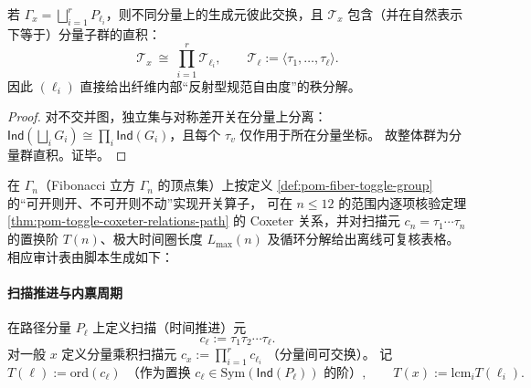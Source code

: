 \begin{corollary}\label{cor:pom-toggle-product-components}
若 \(\Gamma_x=\bigsqcup_{i=1}^r P_{\ell_i}\)，则不同分量上的生成元彼此交换，且 \(\mathcal T_x\) 包含（并在自然表示下等于）分量子群的直积：
\[
\mathcal T_x\ \cong\ \prod_{i=1}^r \mathcal T_{\ell_i},
\qquad
\mathcal T_{\ell}:=\langle \tau_1,\dots,\tau_{\ell}\rangle.
\]
因此 \((\ell_i)\) 直接给出纤维内部“反射型规范自由度”的秩分解。
\end{corollary}
\begin{proof}
对不交并图，独立集与对称差开关在分量上分离：\(\mathsf{Ind}(\bigsqcup_i G_i)\cong\prod_i\mathsf{Ind}(G_i)\)，且每个 \(\tau_v\) 仅作用于所在分量坐标。
故整体群为分量群直积。证毕。
\end{proof}



\begin{remark}[有限窗审计]\label{rem:pom-toggle-coxeter-audit}
在 \(\Gamma_n\)（Fibonacci 立方 \(\Gamma_n\) 的顶点集）上按定义 \ref{def:pom-fiber-toggle-group} 的“可开则开、不可开则不动”实现开关算子，
可在 \(n\le 12\) 的范围内逐项核验定理 \ref{thm:pom-toggle-coxeter-relations-path} 的 Coxeter 关系，并对扫描元 \(c_n=\tau_1\cdots\tau_n\) 的置换阶 \(T(n)\)、极大时间圈长度 \(L_{\max}(n)\) 及循环分解给出离线可复核表格。
相应审计表由脚本生成如下：

\end{remark}

\paragraph{扫描推进与内禀周期}

\begin{definition}[扫描元与内禀周期不变量]\label{def:pom-toggle-coxeter-element}
在路径分量 \(P_{\ell}\) 上定义扫描（时间推进）元
\[
c_{\ell}:=\tau_1\tau_2\cdots\tau_{\ell}.
\]
对一般 \(x\) 定义分量乘积扫描元
\(
c_x:=\prod_{i=1}^r c_{\ell_i}
\)
（分量间可交换）。
\noindent 记
\[
T(\ell):=\mathrm{ord}(c_\ell)\ \ \text{（作为置换 \(c_\ell\in\mathrm{Sym}(\mathsf{Ind}(P_\ell))\) 的阶）},
\qquad
T(x):=\mathrm{lcm}_{i} T(\ell_i).
\]
\end{definition}

